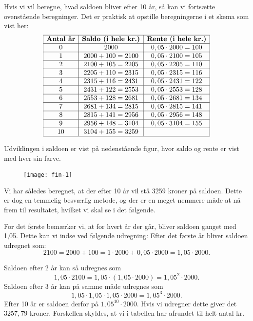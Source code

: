 \documentclass[12pt,oneside,a4paper]{article}
\begin{document}
Hvis vi vil beregne, hvad saldoen bliver efter 10 år, så kan vi fortsætte
ovenstående beregninger. Det er praktisk at opstille beregningerne i et skema
som vist her:
\[
\begin{array}{|c|c|c|}
    \hline
    \mbox{\textbf{Antal år}} & \mbox{\textbf{Saldo (i hele kr.)}} &
        \mbox{\textbf{Rente (i hele kr.)}} \\
    \hline
0 & 2000 & 0,05\cdot 2000 = 100 \\
    \hline
1 & 2000 + 100 = 2100 & 0,05\cdot 2100 = 105 \\
    \hline
2 & 2100 + 105 = 2205 & 0,05\cdot 2205 = 110 \\
    \hline
3 & 2205 + 110 = 2315 & 0,05\cdot 2315 = 116 \\
    \hline
4 & 2315 + 116 = 2431 & 0,05\cdot 2431 = 122 \\
    \hline
5 & 2431 + 122 = 2553 & 0,05\cdot 2553 = 128 \\
    \hline
6 & 2553 + 128 = 2681 & 0,05\cdot 2681 = 134 \\
    \hline
7 & 2681 + 134 = 2815 & 0,05\cdot 2815 = 141 \\
    \hline
8 & 2815 + 141 = 2956 & 0,05\cdot 2956 = 148 \\
    \hline
9 & 2956 + 148 = 3104 & 0,05\cdot 3104 = 155 \\
    \hline
10 & 3104 + 155 = 3259 & \\
\hline
\end{array}
\]

Udviklingen i saldoen er vist på nedenstående figur, hvor saldo og rente er vist
med hver sin farve.
\begin{figure}[H]
    \centering
    \texttt{[image: fin-1]}
\end{figure}

Vi har således beregnet, at der efter 10 år vil stå 3259 kroner på saldoen.  Dette
er dog en temmelig besværlig metode, og der er en meget nemmere måde at nå frem
til resultatet, hvilket vi skal se i det følgende.

For det første bemærker vi, at for hvert år der går, bliver saldoen ganget med
1,05. Dette kan vi indse ved følgende udregning: Efter det første år bliver
saldoen udregnet som:
\[
2100 = 2000 + 100 = 1\cdot 2000 + 0,05\cdot 2000 = 1,05 \cdot 2000.
\]

Saldoen efter 2 år kan så udregnes som
\[
1,05\cdot 2100 = 1,05 \cdot (1,05 \cdot 2000) = 1,05^2 \cdot 2000.
\]
Saldoen efter 3 år kan på samme måde udregnes som
\[
1,05\cdot1,05\cdot1,05\cdot 2000 = 1,05^3 \cdot 2000.
\]
Efter 10 år er saldoen derfor på $1,05^{10}\cdot 2000$. Hvis vi udregner dette
giver det $3257,79$ kroner.
Forskellen skyldes, at vi i tabellen har afrundet til helt antal kr.
\end{document}
